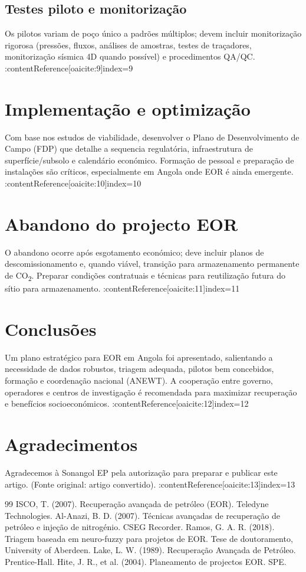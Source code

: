 \documentclass[11pt,a4paper]{article}
\begin{document}
\subsection{Testes piloto e monitorização}
Os pilotos variam de poço único a padrões múltiplos; devem incluir monitorização rigorosa (pressões, fluxos, análises de amostras, testes de traçadores, monitorização sísmica 4D quando possível) e procedimentos QA/QC. :contentReference[oaicite:9]{index=9}

\section{Implementação e optimização}
Com base nos estudos de viabilidade, desenvolver o Plano de Desenvolvimento de Campo (FDP) que detalhe a sequencia regulatória, infraestrutura de superfície/subsolo e calendário económico. Formação de pessoal e preparação de instalações são críticos, especialmente em Angola onde EOR é ainda emergente. :contentReference[oaicite:10]{index=10}

\section{Abandono do projecto EOR}
O abandono ocorre após esgotamento económico; deve incluir planos de descomissionamento e, quando viável, transição para armazenamento permanente de CO\textsubscript{2}. Preparar condições contratuais e técnicas para reutilização futura do sítio para armazenamento. :contentReference[oaicite:11]{index=11}

\section{Conclusões}
Um plano estratégico para EOR em Angola foi apresentado, salientando a necessidade de dados robustos, triagem adequada, pilotos bem concebidos, formação e coordenação nacional (ANEWT). A cooperação entre governo, operadores e centros de investigação é recomendada para maximizar recuperação e benefícios socioeconómicos. :contentReference[oaicite:12]{index=12}

\section*{Agradecimentos}
Agradecemos à Sonangol EP pela autorização para preparar e publicar este artigo. (Fonte original: artigo convertido). :contentReference[oaicite:13]{index=13}

\begin{thebibliography}{99}
 ISCO, T. (2007). Recuperação avançada de petróleo (EOR). Teledyne Technologies.
 Al-Anazi, B. D. (2007). Técnicas avançadas de recuperação de petróleo e injeção de nitrogénio. CSEG Recorder.
 Ramos, G. A. R. (2018). Triagem baseada em neuro-fuzzy para projetos de EOR. Tese de doutoramento, University of Aberdeen.
 Lake, L. W. (1989). Recuperação Avançada de Petróleo. Prentice-Hall.
 Hite, J. R., et al. (2004). Planeamento de projectos EOR. SPE.
\end{thebibliography}
\end{document}
